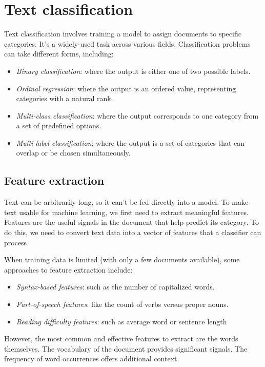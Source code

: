 \section{Text classification}

Text classification involves training a model to assign documents to specific categories. 
It's a widely-used task across various fields. Classification problems can take different forms, including:
\begin{itemize}
    \item \textit{Binary classification}: where the output is either one of two possible labels.
    \item \textit{Ordinal regression}: where the output is an ordered value, representing categories with a natural rank.
    \item \textit{Multi-class classification}: where the output corresponds to one category from a set of predefined options.
    \item \textit{Multi-label classification}: where the output is a set of categories that can overlap or be chosen simultaneously.
\end{itemize}

\subsection{Feature extraction}
Text can be arbitrarily long, so it can't be fed directly into a model.
To make text usable for machine learning, we first need to extract meaningful features.
Features are the useful signals in the document that help predict its category. 
To do this, we need to convert text data into a vector of features that a classifier can process.

When training data is limited (with only a few documents available), some approaches to feature extraction include:
\begin{itemize}
    \item \textit{Syntax-based features}: such as the number of capitalized words.
    \item \textit{Part-of-speech features}: like the count of verbs versus proper nouns.
    \item \textit{Reading difficulty features}: such as average word or sentence length
\end{itemize}
\noindent However, the most common and effective features to extract are the words themselves. 
The vocabulary of the document provides significant signals.
The frequency of word occurrences offers additional context.

